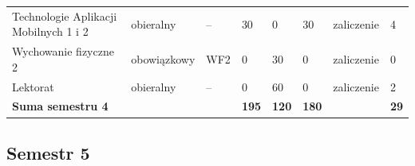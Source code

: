 \documentclass[12pt,a4paper]{article}
\begin{document}
{\begin{longtable}{m{5.0cm}m{1.9cm}m{0.75cm}m{0.85cm}m{0.85cm}m{0.85cm}m{1.45cm}m{0.9cm}}
\rowcolor{tableElective} Technologie Aplikacji Mobilnych 1 i 2 & {\scriptsize obieralny} & -- & 30 & 0 & 30 & {\scriptsize zaliczenie} & 4 \\
\rowcolor{tableRowLight} Wychowanie fizyczne 2 & {\scriptsize obowiązkowy} & WF2 & 0 & 30 & 0 & {\scriptsize zaliczenie} & 0 \\
\rowcolor{tableElective} Lektorat & {\scriptsize obieralny} & -- & 0 & 60 & 0 & {\scriptsize zaliczenie} & 2 \\
\midrule[\heavyrulewidth]
\rowcolor{tableSummary} \textbf{Suma semestru 4} & & & \textbf{195} & \textbf{120} & \textbf{180} & & \textbf{29} \\
\bottomrule
\end{longtable}}

\clearpage
\subsection*{Semestr 5}
\end{document}
